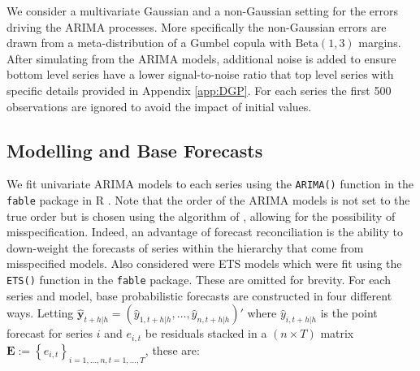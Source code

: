 \documentclass[12pt]{article}
\theoremstyle{definition}
\begin{document}
We consider a multivariate Gaussian and a non-Gaussian setting for the errors driving the ARIMA processes. More specifically the non-Gaussian errors are drawn from a meta-distribution of a Gumbel copula with $\textrm{Beta}(1,3)$ margins. After simulating from the ARIMA models, additional noise is added to ensure bottom level series have a lower signal-to-noise ratio that top level series with specific details provided in Appendix \ref{app:DGP}. For each series the first 500 observations are ignored to avoid the impact of initial values. 


\subsection{Modelling and Base Forecasts}

We fit univariate ARIMA models to each series using the \verb|ARIMA()| function in the \verb|fable| package \citep{Rfable} in R \citep{Rcore}.  Note that the order of the ARIMA models is not set to the true order but is chosen using the algorithm of \cite{hynkan2007}, allowing for the possibility of misspecification.  Indeed, an advantage of forecast reconciliation is the ability to down-weight the forecasts of series within the hierarchy that come from misspecified models.  Also considered were ETS models which were fit using the \verb|ETS()| function in the \verb|fable| package.  These are omitted for brevity.  For each series and model, base probabilistic forecasts are constructed in four different ways.  Letting $\hat{\bm y}_{t+h|h}=\left(\hat{y}_{1,t+h|h},\ldots,\hat{y}_{n,t+h|h}\right)'$ where $\hat{y}_{i,t+h|h}$ is the point forecast for series $i$ and $e_{i,t}$ be residuals stacked in a $(n \times T)$ matrix $\bm{E}:=\left\{e_{i,t}\right\}_{i=1,\dots,n,t=1,\dots,T}$, these are:
\end{document}
